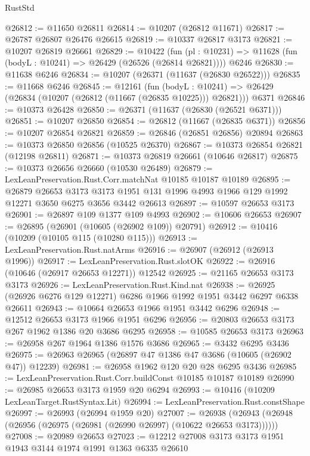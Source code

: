 \begin{lexlean}{RustStd}
\begin{coremodule}
@26812 := @11650 @26811
@26814 := @10207 (@26812 @11671)
@26817 := @26787 @26807 @26476 @26615
@26819 := @10337 @26817 @3173
@26821 := @10207 @26819 @26661
@26829 := @10422
    (fun (pl : @10231) => @11628 (fun (bodyL : @10241) => @26429 (@26526 (@26814 @26821))))
    @6246
@26830 := @11638 @6246
@26834 := @10207 (@26371 (@11637 (@26830 @26522)))
@26835 := @11668 @6246
@26845 := @12161
    (fun (bodyL : @10241) => @26429 (@26834 (@10207 (@26812 (@11667 (@26835 @10225))) @26821)))
    @6371
@26846 := @10373 @26428
@26850 := @26371 (@11637 (@26830 (@26521 @6371)))
@26851 := @10207 @26850
@26854 := @26812 (@11667 (@26835 @6371))
@26856 := @10207 @26854 @26821
@26859 := @26846 (@26851 @26856) @20894
@26863 := @10373 @26850 @26856 (@10525 @26370)
@26867 := @10373 @26854 @26821 (@12198 @26811)
@26871 := @10373 @26819 @26661 (@10646 @26817)
@26875 := @10373 @26656 @26660 (@10530 @26489)
@26879 := LexLeanPreservation.Rust.Corr.matchNat @10185 @10187 @10189
@26895 := @26879
    @26653
    @3173
    @3173
    @1951
    @131
    @1996
    @4993
    @1966
    @129
    @1992
    @12271
    @3650
    @6275
    @3656
    @3442
    @26613
@26897 := @10597 @26653 @3173
@26901 := @26897 @109 @1377 @109 @4993
@26902 := @10606 @26653
@26907 := @26895 (@26901 (@10605 (@26902 @109)) @20791)
@26912 := @10416 (@10209 (@10105 @115 (@10280 @115)))
@26913 := LexLeanPreservation.Rust.natArms
@26916 := @26907 (@26912 (@26913 @1996))
@26917 := LexLeanPreservation.Rust.slotOK
@26922 := @26916 (@10646 (@26917 @26653 @12271)) @12542
@26925 := @21165 @26653 @3173 @3173
@26926 := LexLeanPreservation.Rust.Kind.nat
@26938 := @26925 (@26926 @6276 @129 @12271) @6286 @1966 @1992 @1951 @3442 @6297 @6338 @26611
@26943 := @10664 @26653 @1966 @1951 @3442 @6296
@26948 := @12512 @26653 @3173 @1966 @1951 @6296
@26956 := @20803 @26653 @3173 @267 @1962 @1386 @20 @3686 @6295
@26958 := @10585 @26653 @3173
@26963 := @26958 @267 @1964 @1386 @1576 @3686
@26965 := @3432 @6295 @3436
@26975 := @26963 @26965 (@26897 @47 @1386 @47 @3686 (@10605 (@26902 @47)) @12239)
@26981 := @26958 @1962 @120 @20 @28 @6295 @3436
@26985 := LexLeanPreservation.Rust.Corr.buildConst @10185 @10187 @10189
@26990 := @26985 @26653 @3173 @1959 @20 @6294
@26993 := @10416 (@10209 LexLeanTarget.RustSyntax.Lit)
@26994 := LexLeanPreservation.Rust.constShape
@26997 := @26993 (@26994 @1959 @20)
@27007 := @26938 (@26943 (@26948 (@26956 (@26975 (@26981 (@26990 @26997) (@10622 @26653 @3173))))))
@27008 := @20989 @26653
@27023 := @12212
    @27008
    @3173
    @3173
    @1951
    @1943
    @3144
    @1974
    @1991
    @1363
    @6335
    @26610

\end{coremodule}
\end{lexlean}

